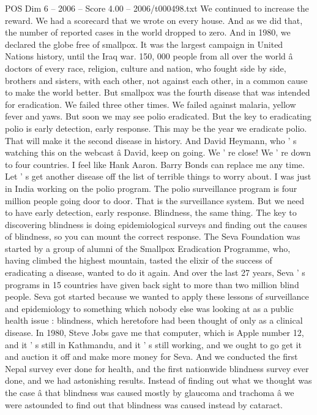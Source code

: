 \begin{textsample}{POS Dim 6 – 2006 – Score 4.00 – 2006/t000498.txt}
We continued to increase the reward.
We had a scorecard that we wrote on every house.
And as we did that, the number of reported cases in the world dropped to zero.
And in 1980, we declared the globe free of smallpox.
It was the largest campaign in United Nations history, until the Iraq war. 150, 000 people from all over the world â doctors of every race, religion, culture and nation, who fought side by side, brothers and sisters, with each other, not against each other, in a common cause to make the world better.
But smallpox was the fourth disease that was intended for eradication.
We failed three other times.
We failed against malaria, yellow fever and yaws.
But soon we may see polio eradicated.
But the key to eradicating polio is early detection, early response.
This may be the year we eradicate polio.
That will make it the second disease in history.
And David Heymann, who ' s watching this on the webcast â David, keep on going.
We ' re close!
We ' re down to four countries.
I feel like Hank Aaron.
Barry Bonds can replace me any time.
Let ' s get another disease off the list of terrible things to worry about.
I was just in India working on the polio program.
The polio surveillance program is four million people going door to door.
That is the surveillance system.
But we need to have early detection, early response.
Blindness, the same thing.
The key to discovering blindness is doing epidemiological surveys and finding out the causes of blindness, so you can mount the correct response.
The Seva Foundation was started by a group of alumni of the Smallpox Eradication Programme, who, having climbed the highest mountain, tasted the elixir of the success of eradicating a disease, wanted to do it again.
And over the last 27 years, Seva ' s programs in 15 countries have given back sight to more than two million blind people.
Seva got started because we wanted to apply these lessons of surveillance and epidemiology to something which nobody else was looking at as a public health issue : blindness, which heretofore had been thought of only as a clinical disease.
In 1980, Steve Jobs gave me that computer, which is Apple number 12, and it ' s still in Kathmandu, and it ' s still working, and we ought to go get it and auction it off and make more money for Seva.
And we conducted the first Nepal survey ever done for health, and the first nationwide blindness survey ever done, and we had astonishing results.
Instead of finding out what we thought was the case â that blindness was caused mostly by glaucoma and trachoma â we were astounded to find out that blindness was caused instead by cataract.

\end{textsample}
